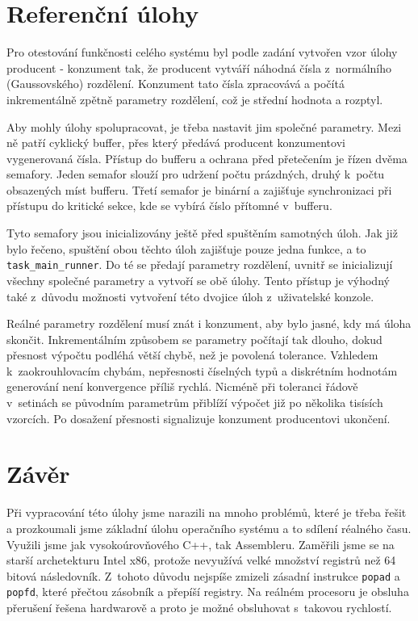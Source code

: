\documentclass[a4paper,12pt]{article}
\begin{document}
\section{Referenční úlohy}
Pro otestování funkčnosti celého systému byl podle zadání vytvořen vzor úlohy producent - konzument tak, že producent vytváří
náhodná čísla z~normálního (Gaussovského) rozdělení. Konzument tato čísla zpracovává a počítá inkrementálně zpětně parametry rozdělení, což je střední hodnota a rozptyl.

Aby mohly úlohy spolupracovat, je třeba nastavit jim společné parametry. Mezi ně patří cyklický buffer, přes který
předává producent konzumentovi vygenerovaná čísla. Přístup do bufferu a ochrana před přetečením je řízen dvěma semafory.
Jeden semafor slouží pro udržení počtu prázdných, druhý k~počtu obsazených míst bufferu. Třetí semafor je binární a zajišťuje synchronizaci při přístupu do kritické sekce, kde se vybírá číslo přítomné v~bufferu.

Tyto semafory jsou inicializovány ještě před spuštěním samotných úloh. Jak již bylo řečeno, spuštění obou těchto úloh
zajišťuje pouze jedna funkce, a to \verb+task_main_runner+. Do té se předají parametry rozdělení, uvnitř se inicializují všechny společné parametry a vytvoří se obě úlohy. Tento přístup je výhodný také z~důvodu možnosti vytvoření této dvojice úloh z~uživatelské konzole.

Reálné parametry rozdělení musí znát i konzument, aby bylo jasné, kdy má úloha skončit. Inkrementálním způsobem se parametry počítají tak dlouho, dokud přesnost výpočtu podléhá větší chybě, než je povolená tolerance. Vzhledem k~zaokrouhlovacím chybám, nepřesnosti číselných typů a diskrétním hodnotám generování není konvergence příliš rychlá. Nicméně při toleranci řádově v~setinách se původním parametrům přiblíží výpočet již po několika tisísích vzorcích. Po dosažení přesnosti signalizuje konzument producentovi ukončení.


\section{Závěr}
Při vypracování této úlohy jsme narazili na mnoho problémů, které je třeba
řešit a prozkoumali jsme základní úlohu operačního systému a to sdílení réalného času.
Využili jsme jak vysokoúrovňového C++, tak Assembleru. Zaměřili jsme se na starší
archetekturu Intel x86, protože nevyužívá velké množství registrů než 64 bitová
následovník. Z~tohoto důvodu nejspíše zmizeli zásadní instrukce \texttt{popad} a \texttt{popfd},
které přečtou zásobník a přepíší registry. Na reálném procesoru je obsluha přerušení řešena
hardwarově a proto je možné obsluhovat s~takovou rychlostí.
\end{document}
